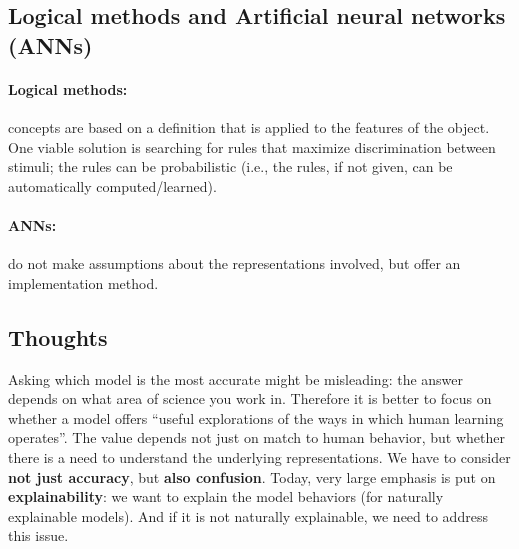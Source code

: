 
\subsection{Logical methods and Artificial neural networks (ANNs)}
\paragraph{Logical methods:} concepts are based on a definition that is applied to the features of the object. One viable solution is searching for rules that maximize discrimination between stimuli; the rules can be probabilistic (i.e., the rules, if not given, can be automatically computed/learned).

\paragraph{ANNs:} do not make assumptions about the representations involved, but offer an implementation method.

\subsection{Thoughts}
Asking which model is the most accurate might be misleading: the answer depends on what area of science you work in. Therefore it is better to focus on whether a model offers ``useful explorations of the ways in which human learning operates”.
The value depends not just on match to human behavior, but whether there is a need to understand the underlying representations. We have to consider \textbf{not just accuracy}, but \textbf{also confusion}.
Today, very large emphasis is put on \textbf{explainability}: we want to explain the model behaviors (for naturally explainable models). And if it is not naturally explainable, we need to address this issue.

